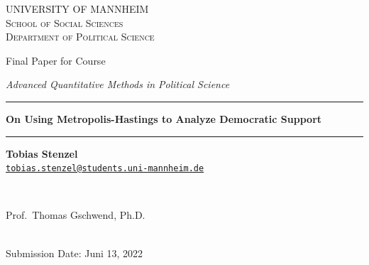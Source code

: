 \documentclass[12pt,english,a4paper,oneside]{article}
\theoremstyle{definition}
\theoremstyle{definition}
\theoremstyle{definition}
\theoremstyle{definition}
\theoremstyle{remark}
\begin{document}
\begin{titlepage}

    \begin{center}
    \large{ \textsc{ \uppercase{University of Mannheim} \\ \vspace{-0.2cm}
School of Social Sciences \\ \vspace{-0.2cm}
Department of Political Science}}

      
        \vspace{3.5cm}
        

       \large{   Final Paper for Course   }


       \large{ \textit{   Advanced Quantitative Methods in Political Science   }}

\renewcommand{\linethickness}{0.03em}
\rule{\linewidth}{\linethickness}


       \LARGE{ \textbf{   On Using Metropolis-Hastings to Analyze Democratic Support   }}


       \large{  }

        \vspace{-0.2cm}
\rule{\linewidth}{\linethickness}


\begin{minipage}[t]{0.5\textwidth}
\begin{flushleft}
\singlespacing
 \textbf{Tobias Stenzel}  \\ 


 \href{mailto:tobias.stenzel@students.uni-mannheim.de}{\nolinkurl{tobias.stenzel@students.uni-mannheim.de}}  \\ 

\end{flushleft}
\end{minipage}
\begin{minipage}[t]{0.4\textwidth}
\hfill
\end{minipage}\\
\vspace{0.2cm}
\begin{minipage}[t]{0.35\textwidth}
\hfill
\end{minipage}
\begin{minipage}[t]{0.55\textwidth}
\begin{flushright}
\singlespacing
     Prof.~Thomas Gschwend, Ph.D.  \\       

\end{flushright}
\end{minipage}\\
%


         \vfill
         Submission Date: Juni 13, 2022 \\ 
        





         \vfill



     \end{center}
    \thispagestyle{empty}
\end{titlepage}
\end{document}
